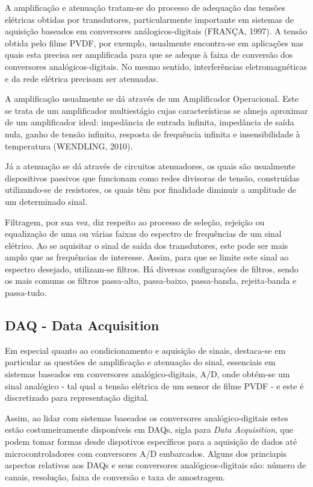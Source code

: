 \documentclass[
	12pt,				
	oneside,			
	a4paper,			
	english,			
	brazil,			
	]{abntex2ppgsi}
\begin{document}
A amplificação e atenuação tratam-se do processo de adequação das tensões elétricas obtidas por transdutores, particularmente importante em sistemas de aquisição baseados em conversores análogicos-digitais (FRANÇA, 1997). A tensão obtida pelo filme PVDF, por exemplo, usualmente encontra-se em aplicações nas quais esta precisa ser amplificada para que se adeque à faixa de conversão dos conversores analógicos-digitais. No mesmo sentido, interferências eletromagnéticas e da rede elétrica precisam ser atenuadas. 

A amplificação usualmente se dá através de um Amplificador Operacional. Este se trata de um amplificador multiestágio cujas características se almeja aproximar de um amplificador ideal: impedância de entrada infinita, impedância de saída nula, ganho de tensão infinito, resposta de frequência infinita e insensibilidade à temperatura (WENDLING, 2010). 

Já a atenuação se dá através de circuitos atenuadores, os quais são usualmente dispositivos passivos que funcionam como redes divisoras de tensão, construídas utilizando-se de resistores, os quais têm por finalidade diminuir a amplitude de um determinado sinal.


Filtragem, por sua vez, diz respeito ao processo de seleção, rejeição ou equalização de uma ou várias faixas do espectro de frequências de um sinal elétrico. Ao se aquisitar o sinal de saída dos transdutores, este pode ser mais amplo que as frequências de interesse. Assim, para que se limite este sinal ao espectro desejado, utilizam-se filtros. Há diversas configurações de filtros, sendo os mais comums os filtros passa-alto, passa-baixo, passa-banda, rejeita-banda e passa-tudo. 


\subsection{\textbf{DAQ - Data Acquisition}}

Em especial quanto ao condicionamento e aquisição de sinais, destaca-se em particular as questões de amplificação e atenuação do sinal, essenciais em sistemas baseados em conversores analógico-digitais, A/D, onde obtém-se um sinal analógico - tal qual a tensão elétrica de um sensor de filme PVDF - e este é discretizado para representação digital. 

Assim, ao lidar com sistemas baseados os conversores analógico-digitais estes estão costumeiramente disponíveis em DAQs, sigla para \textit{Data Acquisition}, que podem tomar formas desde dispotivos específicos para a aquisição de dados até microcontroladores com conversores A/D embarcados. Alguns dos princiapis aspectos relativos aos DAQs e seus conversores analógicos-digitais são: número de canais, resolução, faixa de conversão e taxa de amostragem.
\end{document}
